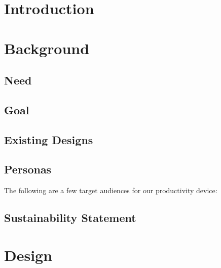 \documentclass{article}
\begin{document}
\maketitle
\newpage

\section{Introduction}




\newpage

\tableofcontents
\newpage

\section{Background}

\subsection{Need}


\subsection{Goal}


\subsection{Existing Designs}



\subsection{Personas}
The following are a few target audiences for our productivity device:






\subsection{Sustainability Statement}


\newpage

\section{Design}
\end{document}
